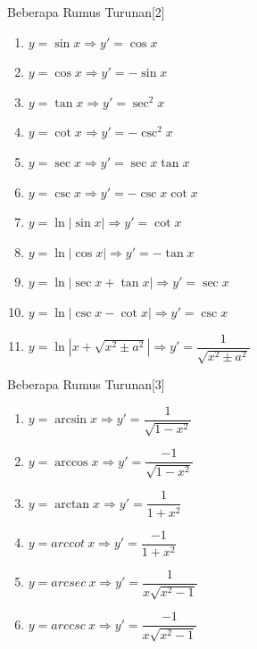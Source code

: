 \documentclass{beamer}
\newcounter{saveenumi}
\newcommand{\seti}{\setcounter{saveenumi}{\value{enumi}}}
\newcommand{\conti}{\setcounter{enumi}{\value{saveenumi}}}
\begin{document}
\begin{frame}[t, fragile]{Beberapa Rumus Turunan[2]}
\begin{enumerate}
\conti
\item $y=\sin{x} \Longrightarrow y'=\cos x$
\item $y=\cos x \Longrightarrow y'= - \sin x$
\item $y= \tan x \Longrightarrow y'=\sec^2 x$
\item $y= \cot x \Longrightarrow y' = -\csc ^2 x$
\item $y= \sec x \Longrightarrow y' = \sec x \tan x$
\item $y= \csc x \Longrightarrow y'= - \csc x \cot x$
\item $y= \ln |\sin x| \Longrightarrow y'= \cot x$
\item $y= \ln |\cos x| \Longrightarrow y'= - \tan x$
\item $y= \ln |\sec x + \tan x| \Longrightarrow y'= \sec x$
\item $y= \ln |\csc x - \cot x| \Longrightarrow y'= \csc x$
\item $y= \ln | x + \sqrt{x^2 \pm a^2} | \Longrightarrow y'= \dfrac{1}{\sqrt{x^2\pm a^2}}$
\seti
\end{enumerate}
\end{frame}

\begin{frame}[t, fragile]{Beberapa Rumus Turunan[3]}
\begin{enumerate}
\conti
\item $y= \arcsin x \Longrightarrow y'= \dfrac{1}{\sqrt{1-x^2}}$
\item $y= \arccos x \Longrightarrow y'= \dfrac{-1}{\sqrt{1-x^2}}$
\item $y= \arctan x \Longrightarrow y'= \dfrac{1}{1+x^2}$
\item $y= arccot ~x \Longrightarrow y'= \dfrac{-1}{1+x^2}$
\item $y= arcsec ~x \Longrightarrow y'= \dfrac{1}{x \sqrt{x^2-1}}$
\item $y= arccsc ~x \Longrightarrow y'= \dfrac{-1}{x \sqrt{x^2-1}}$
\end{enumerate}
\end{frame}
\end{document}
